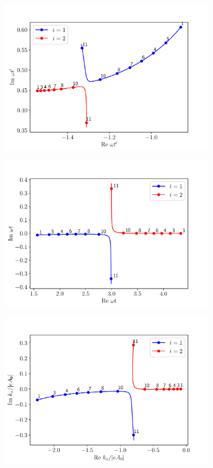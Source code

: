 \begin{figure}
\begin{subfigure}[b]{0.33\linewidth}
  \includegraphics[width=\textwidth]{figures/ch_ATI_SPA/rescattering/start12.pdf}
\end{subfigure}
\begin{subfigure}[b]{0.33\linewidth}
  \includegraphics[width=\textwidth]{figures/ch_ATI_SPA/rescattering/return12.pdf}
\end{subfigure}
\begin{subfigure}[b]{0.33\linewidth}
  \includegraphics[width=\textwidth]{figures/ch_ATI_SPA/rescattering/momentum12.pdf}

\end{subfigure}
\end{figure}
